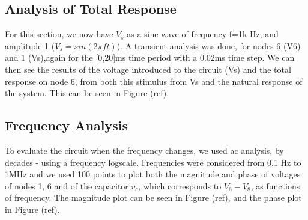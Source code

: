 \subsection{Analysis of Total Response}
For this section, we now have $V_s$ as a sine wave of frequency f=1k Hz, and amplitude 1 ($V_s=sin(2\pi f t)$). A transient analysis was done, for nodes 6 (V6) and 1 (Vs),again for the [0,20]ms time period with a 0.02ms time step. We can then see the results of the voltage introduced to the circuit (Vs) and the total response on node 6, from both this stimulus from Vs and the natural response of the system. This can be seen in Figure (ref).\\
\subsection{Frequency Analysis}
To evaluate the circuit when the frequency changes, we used ac analysis, by decades - using a frequency logscale. Frequencies were considered from 0.1 Hz to 1MHz and we used 100 points to plot both the magnitude and phase of voltages of nodes 1, 6 and of the capacitor $v_c$, which corresponds to $V_6 - V_8$, as functions of frequency. The magnitude plot can be seen in Figure (ref), and the phase plot in Figure (ref).\\
